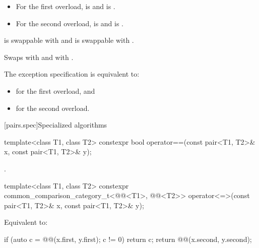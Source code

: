 \begin{itemdescr}
\pnum
\mandates
\begin{itemize}
\item
For the first overload,
 is  and
 is .
\item
For the second overload,
 is  and
 is .
\end{itemize}

\pnum
\expects
{} is swappable with  and
 is swappable with .

\pnum
\effects
Swaps
 with  and
 with .

\pnum
\remarks
The exception specification is equivalent to:
\begin{itemize}
\item
{}
for the first overload, and
\item
{}
for the second overload.
\end{itemize}
\end{itemdescr}

[pairs.spec]{Specialized algorithms}

%
\begin{itemdecl}
template<class T1, class T2>
  constexpr bool operator==(const pair<T1, T2>& x, const pair<T1, T2>& y);
\end{itemdecl}

\begin{itemdescr}
\pnum
\returns
{}.
\end{itemdescr}

%
\begin{itemdecl}
template<class T1, class T2>
  constexpr common_comparison_category_t<@@<T1>,
                                         @@<T2>>
    operator<=>(const pair<T1, T2>& x, const pair<T1, T2>& y);
\end{itemdecl}

\begin{itemdescr}
\pnum
\effects
Equivalent to:
\begin{codeblock}
if (auto c = @@(x.first, y.first); c != 0) return c;
return @@(x.second, y.second);
\end{codeblock}
\end{itemdescr}

